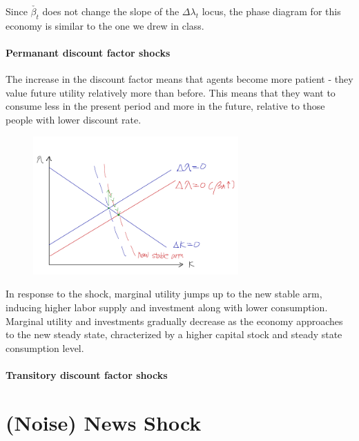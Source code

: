 \documentclass[11pt]{amsart}
\begin{document}
Since $\check{\beta_t}$ does not change the slope of the $\Delta \lambda_t$ locus, the phase diagram for this economy is similar to the one we drew in class. 

\paragraph{ \bf Permanant discount factor shocks}
The increase in the discount factor means that agents become more patient - they value future utility relatively more than before. This means that they want to consume less in the present period and more in the future, relative to those people with lower discount rate. 
\begin{figure}[H]
	\centering
	\includegraphics[width=0.7\textwidth]{2_1_Minki.png}
\end{figure}
In response to the shock, marginal utility jumps up to the new stable arm, inducing higher labor supply and investment along with lower consumption. Marginal utility and investments gradually decrease as the economy approaches to the new steady state, chracterized by a higher capital stock and steady state consumption level. 
\paragraph{\bf Transitory discount factor shocks}

\section{(Noise) News Shock}
\end{document}
